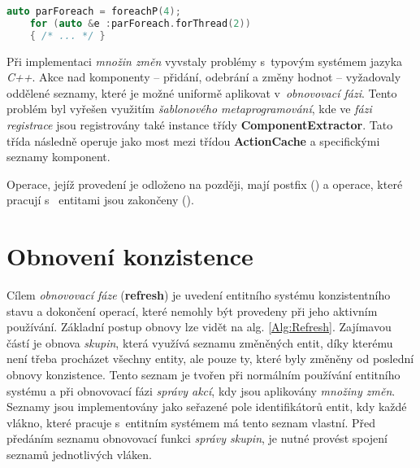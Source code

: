 \begin{lstlisting}[language=C++]
	auto parForeach = foreachP(4);
	for (auto &e :parForeach.forThread(2))
	{ /* ... */ }
\end{lstlisting}

Při implementaci \emph{množin změn} vyvstaly problémy s~typovým systémem jazyka \emph{C++}. Akce nad komponenty -- přidání, odebrání a změny hodnot -- vyžadovaly oddělené seznamy, které je možné uniformě aplikovat v~\emph{obnovovací fázi}. Tento problém byl vyřešen využitím \emph{šablonového metaprogramování}, kde ve \emph{fázi registrace} jsou registrovány také instance třídy \textbf{ComponentExtractor}. Tato třída následně operuje jako most mezi třídou \textbf{ActionCache} a specifickými seznamy komponent.

Operace, jejíž provedení je odloženo na později, mají postfix  () a operace, které pracují s~ entitami jsou zakončeny  ().

\section{Obnovení konzistence}

Cílem \emph{obnovovací fáze} (\textbf{refresh}) je uvedení entitního systému konzistentního stavu a dokončení operací, které nemohly být provedeny při jeho aktivním používání. Základní postup obnovy lze vidět na alg. \ref{Alg:Refresh}. Zajímavou částí je obnova \emph{skupin}, která využívá seznamu změněných entit, díky kterému není třeba procházet všechny entity, ale pouze ty, které byly změněny od poslední obnovy konzistence. Tento seznam je tvořen při normálním používání entitního systému a při obnovovací fázi \emph{správy akcí}, kdy jsou aplikovány \emph{množiny změn}. Seznamy jsou implementovány jako seřazené pole identifikátorů entit, kdy každé vlákno, které pracuje s~entitním systémem má tento seznam vlastní. Před předáním seznamu obnovovací funkci \emph{správy skupin}, je nutné provést spojení seznamů jednotlivých vláken.

